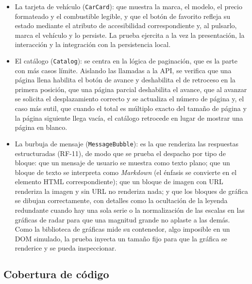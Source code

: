 \begin{itemize}
  \item La tarjeta de vehículo (\texttt{CarCard}): que muestra la marca, el
        modelo, el precio formateado y el combustible legible, y que el botón
        de favorito refleja su estado mediante el atributo de accesibilidad
        correspondiente y, al pulsarlo, marca el vehículo y lo persiste. La prueba
        ejercita a la vez la presentación, la interacción y la integración con la
        persistencia local.

  \item El catálogo (\texttt{Catalog}): se centra en la lógica de paginación, que
        es la parte con más casos límite. Aislando las llamadas a la API, se
        verifica que una página llena habilita el botón de avance y deshabilita el
        de retroceso en la primera posición, que una página parcial deshabilita el
        avance, que al avanzar se solicita el desplazamiento correcto y se
        actualiza el número de página y, el caso más sutil, que cuando el total es
        múltiplo exacto del tamaño de página y la página siguiente llega vacía, el
        catálogo retrocede en lugar de mostrar una página en blanco.

  \item La burbuja de mensaje (\texttt{MessageBubble}): es la que renderiza las
        respuestas estructuradas (RF-11), de modo que se prueba el despacho por
        tipo de bloque: que un mensaje de usuario se muestra como texto plano; que
        un bloque de texto se interpreta como \emph{Markdown} (el énfasis se
        convierte en el elemento HTML correspondiente); que un bloque de imagen
        con URL renderiza la imagen y sin URL no renderiza nada; y que los bloques
        de gráfica se dibujan correctamente, con detalles como la ocultación de la
        leyenda redundante cuando hay una sola serie o la normalización de las
        escalas en las gráficas de radar para que una magnitud grande no aplaste a
        las demás. Como la biblioteca de gráficas mide su contenedor, algo
        imposible en un DOM simulado, la prueba inyecta un tamaño fijo para que la
        gráfica se renderice y se pueda inspeccionar.
\end{itemize}

\subsection{Cobertura de código}
\label{sec:test-cobertura}

